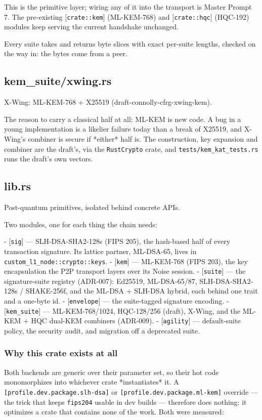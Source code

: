 \documentclass[11pt,a4paper]{article}
\begin{document}
This is the primitive layer; wiring any of it into the transport is Master
Prompt 7. The pre-existing [\texttt{crate::kem}] (ML-KEM-768) and [\texttt{crate::hqc}]
(HQC-192) modules keep serving the current handshake unchanged.

Every suite takes and returns byte slices with exact per-suite lengths,
checked on the way in: the bytes come from a peer.

\subsection{kem\_suite/xwing.rs}
X-Wing: ML-KEM-768 + X25519 (draft-connolly-cfrg-xwing-kem).

The reason to carry a classical half at all: ML-KEM is new code. A bug in
a young implementation is a likelier failure today than a break of
X25519, and X-Wing's combiner is secure if *either* half is. The
construction, key expansion and combiner are the draft's, via the \texttt{RustCrypto}
crate, and \texttt{tests/kem\_kat\_tests.rs} runs the draft's own vectors.

\subsection{lib.rs}
Post-quantum primitives, isolated behind concrete APIs.

Two modules, one for each thing the chain needs:

- [\texttt{sig}] — SLH-DSA-SHA2-128s (FIPS 205), the hash-based half of every
  transaction signature. Its lattice partner, ML-DSA-65, lives in
  \texttt{custom\_l1\_node::crypto::keys}.
- [\texttt{kem}] — ML-KEM-768 (FIPS 203), the key encapsulation the P2P transport
  layers over its Noise session.
- [\texttt{suite}] — the signature-suite registry (ADR-007): Ed25519, ML-DSA-65/87,
  SLH-DSA-SHA2-128s / SHAKE-256f, and the ML-DSA + SLH-DSA hybrid, each
  behind one trait and a one-byte id.
- [\texttt{envelope}] — the suite-tagged signature encoding.
- [\texttt{kem\_suite}] — ML-KEM-768/1024, HQC-128/256 (draft), X-Wing, and the
  ML-KEM + HQC dual-KEM combiners (ADR-009).
- [\texttt{agility}] — default-suite policy, the security audit, and migration
  off a deprecated suite.

\subsubsection{Why this crate exists at all}

Both backends are generic over their parameter set, so their hot code
monomorphizes into whichever crate *instantiates* it. A
\texttt{[profile.dev.package.slh-dsa]} or \texttt{[profile.dev.package.ml-kem]} override —
the trick that keeps \texttt{fips204} usable in dev builds — therefore does
nothing: it optimizes a crate that contains none of the work. Both were
measured:
\end{document}
